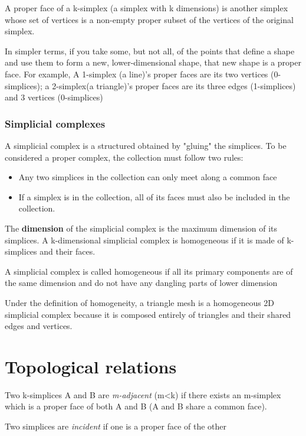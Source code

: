 \begin{definition}
    A proper face of a k-simplex (a simplex with k dimensions) is another simplex whose set of vertices is a non-empty proper subset of the vertices of the original simplex.
\end{definition}

In simpler terms, if you take some, but not all, of the points that define a shape and use them to form a new, lower-dimensional shape, that new shape is a proper face. For example, A 1-simplex (a line)'s proper faces are its two vertices (0-simplices); a 2-simplex(a triangle)'s proper faces are its three edges (1-simplices) and 3 vertices (0-simplices)

\subsubsection{Simplicial complexes}
A simplicial complex is a structured obtained by "gluing" the simplices. To be considered a proper complex, the collection must follow two rules:

\begin{itemize}[noitemsep]
    \item Any two simplices in the collection can only meet along a common face
    \item If a simplex is in the collection, all of its faces must also be included in the collection. 
\end{itemize}

The \textbf{dimension} of the simplicial complex is the maximum dimension of its simplices. A k-dimensional simplicial complex is homogeneous if it is made of k-simplices and their faces.

\begin{definition}[Homogeneity]
    A simplicial complex is called homogeneous if all its primary components are of the same dimension and do not have any dangling parts of lower dimension
\end{definition}

Under the definition of homogeneity, a triangle mesh is a homogeneous 2D simplicial complex because it is composed entirely of triangles and their shared edges and vertices.

\section{Topological relations}

\begin{definition}
    Two k-simplices A and B are \emph{m-adjacent} (m<k) if there exists an m-simplex which is a proper face of both A and B (A and B share a common face).\par
    Two simplices are \emph{incident} if one is a proper face of the other
\end{definition}

